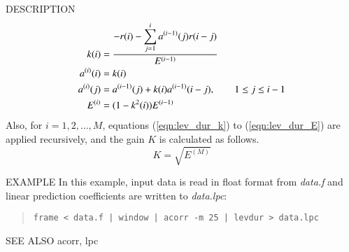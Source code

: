 \begin{qsection}{DESCRIPTION}
\begin{align}
k(i)       &= \frac{\displaystyle{-r(i)-\sum_{j=1}^i a^{(i-1)}(j)r(i-j)}}
		{E^{(i-1)}} \label{eqn:lev_dur_k}\notag\\
a^{(i)}(i) &= k(i) \notag\\
a^{(i)}(j) &=  a^{(i-1)}(j) + k(i) a^{(i-1)}(i-j), 
		\qquad 1\leq j \leq i-1\\
E^{(i)}    &= (1-k^2(i)) E^{(i-1)} \label{eqn:lev_dur_E}
\end{align}
Also, for $i=1,2,\ldots,M$, equations (\ref{eqn:lev_dur_k}) to
 (\ref{eqn:lev_dur_E}) are applied recursively,
and the gain $K$ is calculated as follows.
\begin{displaymath}
K = \sqrt{E^{(M)}}
\end{displaymath}
\end{qsection}

\begin{options}
\end{options}

\begin{qsection}{EXAMPLE}
In this example, input data is read in float format from
{\em data.f} and linear prediction coefficients are written
to {\em data.lpc}:
\begin{quote}
 \verb!frame < data.f | window | acorr -m 25 | levdur > data.lpc!
\end{quote} 
\end{qsection}

\begin{qsection}{SEE ALSO}
 acorr, lpc
\end{qsection}
